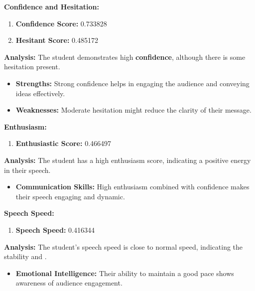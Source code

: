 \documentclass{article}
\begin{document}
    \vspace{0.1in}
    \large{\textbf{Confidence and Hesitation:}}
    \begin{tcolorbox}[colback=green!10!white, colframe=green!80!black, title=Confidence and Hesitant Scores]
        \begin{enumerate}
            \item \textbf{Confidence Score:} \textcolor{green!50!black}{0.733828}
            \item \textbf{Hesitant Score:} \textcolor{red!70!black}{0.485172}
        \end{enumerate}
        \textbf{Analysis:} The student demonstrates high \textbf{confidence}, although there is some hesitation present.
        \begin{itemize}
            \item \textbf{Strengths:} Strong confidence helps in engaging the audience and conveying ideas effectively.
            \item \textbf{Weaknesses:} Moderate hesitation might reduce the clarity of their message.
        \end{itemize}
    \end{tcolorbox}
    \vspace{0.1in}
    \large{\textbf{Enthusiasm:}}
    \begin{tcolorbox}[colback=orange!10!white, colframe=orange!80!black, title=Enthusiastic Score]
        \begin{enumerate}
            \item \textbf{Enthusiastic Score:} \textcolor{orange!70!black}{0.466497}
        \end{enumerate}
        \textbf{Analysis:} The student has a high enthusiasm score, indicating a positive energy in their speech.
        \begin{itemize}
            \item \textbf{Communication Skills:} High enthusiasm combined with confidence makes their speech engaging and dynamic.
        \end{itemize}
    \end{tcolorbox}
    \vspace{0.1in}
    \large{\textbf{Speech Speed:}}
    \begin{tcolorbox}[colback=purple!10!white, colframe=purple!80!black, title=Speech Speed]
        \begin{enumerate}
            \item \textbf{Speech Speed:} \textcolor{purple!70!black}{0.416344}
        \end{enumerate}
        \textbf{Analysis:} The student's speech speed is close to normal speed, indicating the stability and .
        \begin{itemize}
            \item \textbf{Emotional Intelligence:} Their ability to maintain a good pace shows awareness of audience engagement.
        \end{itemize}
    \end{tcolorbox}
\end{document}
